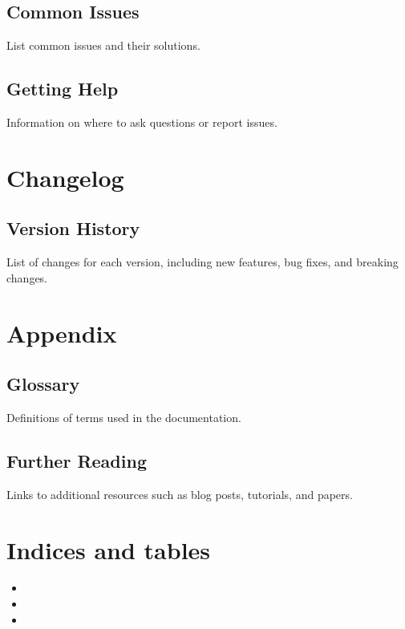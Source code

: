 \documentclass[letterpaper,10pt,english]{sphinxmanual}
\begin{document}
\section{Common Issues}
\label{\detokenize{troubleshooting:common-issues}}
\sphinxAtStartPar
List common issues and their solutions.


\section{Getting Help}
\label{\detokenize{troubleshooting:getting-help}}
\sphinxAtStartPar
Information on where to ask questions or report issues.

\sphinxstepscope


\chapter{Changelog}
\label{\detokenize{changelog:changelog}}\label{\detokenize{changelog::doc}}

\section{Version History}
\label{\detokenize{changelog:version-history}}
\sphinxAtStartPar
List of changes for each version, including new features, bug fixes, and breaking changes.

\sphinxstepscope


\chapter{Appendix}
\label{\detokenize{appendix:appendix}}\label{\detokenize{appendix::doc}}

\section{Glossary}
\label{\detokenize{appendix:glossary}}
\sphinxAtStartPar
Definitions of terms used in the documentation.


\section{Further Reading}
\label{\detokenize{appendix:further-reading}}
\sphinxAtStartPar
Links to additional resources such as blog posts, tutorials, and papers.


\chapter{Indices and tables}
\label{\detokenize{index:indices-and-tables}}\begin{itemize}
\item {} 
\sphinxAtStartPar
{}

\item {} 
\sphinxAtStartPar
{}

\item {} 
\sphinxAtStartPar
{}

\end{itemize}
\end{document}
